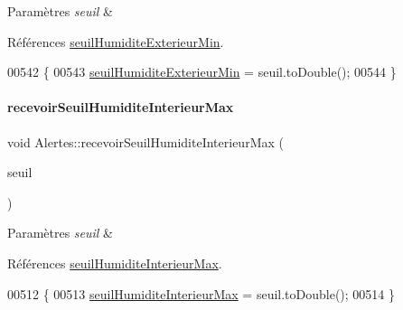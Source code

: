 \begin{DoxyParams}{Paramètres}
{\em seuil} & \\
\hline
\end{DoxyParams}


Références \hyperlink{class_alertes_a18afbc02513a6e4fa8baa665092719c9}{seuil\+Humidite\+Exterieur\+Min}.


\begin{DoxyCode}
00542 \{
00543     \hyperlink{class_alertes_a18afbc02513a6e4fa8baa665092719c9}{seuilHumiditeExterieurMin} = seuil.toDouble();
00544 \}
\end{DoxyCode}
\mbox{\label{class_alertes_a7554e8b6752b0e0a5cfefeecfbc3ba56}} 
\paragraph{\texorpdfstring{recevoir\+Seuil\+Humidite\+Interieur\+Max}{recevoirSeuilHumiditeInterieurMax}}
{\footnotesize\ttfamily void Alertes\+::recevoir\+Seuil\+Humidite\+Interieur\+Max (\begin{DoxyParamCaption}\item[{Q\+String}]{seuil }\end{DoxyParamCaption})\hspace{0.3cm}{\ttfamily [slot]}}


\begin{DoxyParams}{Paramètres}
{\em seuil} & \\
\hline
\end{DoxyParams}


Références \hyperlink{class_alertes_a795cd3721854335f6c91e6009b324c37}{seuil\+Humidite\+Interieur\+Max}.


\begin{DoxyCode}
00512 \{
00513     \hyperlink{class_alertes_a795cd3721854335f6c91e6009b324c37}{seuilHumiditeInterieurMax} = seuil.toDouble();
00514 \}
\end{DoxyCode}
\mbox{\label{class_alertes_a4444f527a708f8e1963d2dc1c95bad96}} 
